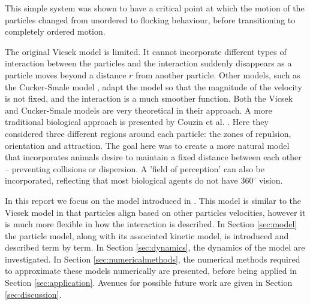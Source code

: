 This simple system was shown to have a critical point at which the motion of the particles changed from unordered to flocking behaviour, before transitioning to completely ordered motion. 

The original Vicsek model is limited. It cannot incorporate different types of interaction between the particles and the interaction suddenly disappears as a particle moves beyond a distance $r$ from another particle. Other models, such as the Cucker-Smale model \cite{Cucker07}, adapt the model so that the magnitude of the velocity is not fixed, and the interaction is a much smoother function. Both the Vicsek and Cucker-Smale models are very theoretical in their approach. A more traditional biological approach is presented by Couzin et al. \cite{Couzin02}. Here they considered three different regions around each particle: the zones of repulsion, orientation and attraction. The goal here was to create a more natural model that incorporates animals desire to maintain a fixed distance between each other -- preventing collisions or dispersion. A 'field of perception' can also be incorporated, reflecting that most biological agents do not have $360^{\circ}$ vision.

In this report we focus on the model introduced in \cite{Butta2019}. This model is similar to the Vicsek model in that particles align based on other particles velocities, however it is much more flexible in how the interaction is described. In Section \ref{sec:model} the particle model, along with its associated kinetic model, is introduced and described term by term. In Section \ref{sec:dynamics}, the dynamics of the model are investigated. In Section \ref{sec:numericalmethods}, the numerical methods required to approximate these models numerically are presented, before being applied in Section \ref{sec:application}. Avenues for possible future work are given in Section \ref{sec:discussion}.
